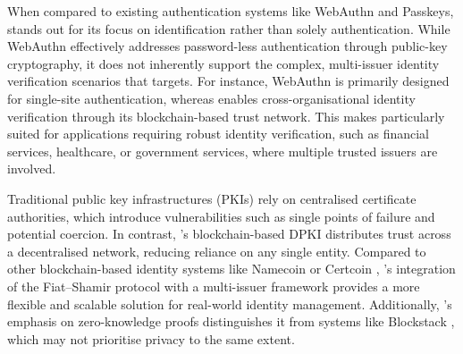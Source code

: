 When compared to existing authentication systems like WebAuthn and Passkeys, \deeid stands out for its focus on identification rather than solely authentication. While WebAuthn effectively addresses password-less authentication through public-key cryptography, it does not inherently support the complex, multi-issuer identity verification scenarios that \deeid targets. For instance, WebAuthn is primarily designed for single-site authentication, whereas \deeid enables cross-organisational identity verification through its blockchain-based trust network. This makes \deeid particularly suited for applications requiring robust identity verification, such as financial services, healthcare, or government services, where multiple trusted issuers are involved.

Traditional public key infrastructures (PKIs) rely on centralised certificate authorities, which introduce vulnerabilities such as single points of failure and potential coercion. In contrast, \deeid's blockchain-based DPKI distributes trust across a decentralised network, reducing reliance on any single entity. Compared to other blockchain-based identity systems like Namecoin \cite{noauthor_namecoin_nodate} or Certcoin \cite{fromknecht_certcoin_2014}, \deeid's integration of the Fiat--Shamir protocol with a multi-issuer framework provides a more flexible and scalable solution for real-world identity management. Additionally, \deeid's emphasis on zero-knowledge proofs distinguishes it from systems like Blockstack \cite{noauthor_blockstack_nodate}, which may not prioritise privacy to the same extent.





